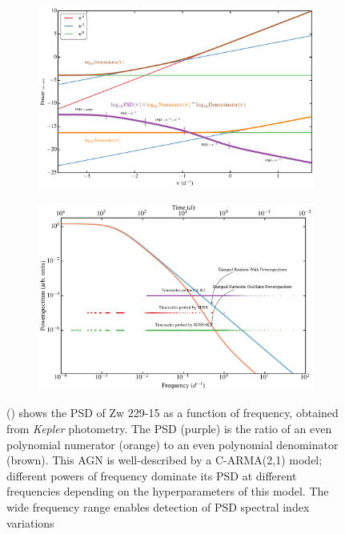 \begin{figure}
  \begin{subfigure}[t]{0.5\textwidth}
    \centering\includegraphics[width=0.9\linewidth]{figs/agn/AGN_Variability_01.pdf}
    \centering
    \caption{}
    \label{fig:PSDvsFreq}
  \end{subfigure}
  \begin{subfigure}[t]{0.5\textwidth}
    \centering\includegraphics[width=0.9\linewidth]{figs/agn/PowerOfSDSSK2.jpg}
    \centering
    \caption{}
    \label{fig:SDSSK2Power}
  \end{subfigure}
  \caption{() shows the PSD of Zw 229-15 as a function of frequency,
  obtained from {\em Kepler} photometry. The PSD (purple) is the ratio of an even
  polynomial numerator (orange) to an even polynomial denominator (brown).
  This AGN is well-described by a C-ARMA(2,1) model; different powers of frequency
  dominate its PSD at different frequencies depending on the hyperparameters of
  this model. The wide frequency range enables detection of PSD spectral index variations
}
\end{figure}
